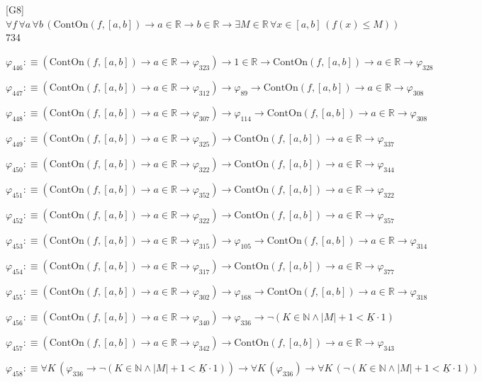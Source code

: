 \begin{fullproof}{[G8]}{$\forall f\,\forall a\,\forall b\,(\mathrm{ContOn}(f,[a,b]) \to a \in \mathbb{R} \to b \in \mathbb{R} \to \exists M \in \mathbb{R}\,\forall x \in [a,b]\,(f(x) \leq M))$}{734}
\begin{abbrevlist}
\item $\varphi_{446} :\equiv (\mathrm{ContOn}(f,[a,b]) \to a \in \mathbb{R} \to \varphi_{323}) \to 1 \in \mathbb{R} \to \mathrm{ContOn}(f,[a,b]) \to a \in \mathbb{R} \to \varphi_{328}$
\item $\varphi_{447} :\equiv (\mathrm{ContOn}(f,[a,b]) \to a \in \mathbb{R} \to \varphi_{312}) \to \varphi_{89} \to \mathrm{ContOn}(f,[a,b]) \to a \in \mathbb{R} \to \varphi_{308}$
\item $\varphi_{448} :\equiv (\mathrm{ContOn}(f,[a,b]) \to a \in \mathbb{R} \to \varphi_{307}) \to \varphi_{114} \to \mathrm{ContOn}(f,[a,b]) \to a \in \mathbb{R} \to \varphi_{308}$
\item $\varphi_{449} :\equiv (\mathrm{ContOn}(f,[a,b]) \to a \in \mathbb{R} \to \varphi_{325}) \to \mathrm{ContOn}(f,[a,b]) \to a \in \mathbb{R} \to \varphi_{337}$
\item $\varphi_{450} :\equiv (\mathrm{ContOn}(f,[a,b]) \to a \in \mathbb{R} \to \varphi_{322}) \to \mathrm{ContOn}(f,[a,b]) \to a \in \mathbb{R} \to \varphi_{344}$
\item $\varphi_{451} :\equiv (\mathrm{ContOn}(f,[a,b]) \to a \in \mathbb{R} \to \varphi_{352}) \to \mathrm{ContOn}(f,[a,b]) \to a \in \mathbb{R} \to \varphi_{322}$
\item $\varphi_{452} :\equiv (\mathrm{ContOn}(f,[a,b]) \to a \in \mathbb{R} \to \varphi_{322}) \to \mathrm{ContOn}(f,[a,b]) \to a \in \mathbb{R} \to \varphi_{357}$
\item $\varphi_{453} :\equiv (\mathrm{ContOn}(f,[a,b]) \to a \in \mathbb{R} \to \varphi_{315}) \to \varphi_{105} \to \mathrm{ContOn}(f,[a,b]) \to a \in \mathbb{R} \to \varphi_{314}$
\item $\varphi_{454} :\equiv (\mathrm{ContOn}(f,[a,b]) \to a \in \mathbb{R} \to \varphi_{317}) \to \mathrm{ContOn}(f,[a,b]) \to a \in \mathbb{R} \to \varphi_{377}$
\item $\varphi_{455} :\equiv (\mathrm{ContOn}(f,[a,b]) \to a \in \mathbb{R} \to \varphi_{302}) \to \varphi_{168} \to \mathrm{ContOn}(f,[a,b]) \to a \in \mathbb{R} \to \varphi_{318}$
\item $\varphi_{456} :\equiv (\mathrm{ContOn}(f,[a,b]) \to a \in \mathbb{R} \to \varphi_{340}) \to \varphi_{336} \to \neg (K \in \mathbb{N} \land \lvert M \rvert + 1 < \underline{K} \cdot 1)$
\item $\varphi_{457} :\equiv (\mathrm{ContOn}(f,[a,b]) \to a \in \mathbb{R} \to \varphi_{342}) \to \mathrm{ContOn}(f,[a,b]) \to a \in \mathbb{R} \to \varphi_{343}$
\item $\varphi_{458} :\equiv \forall K\,(\varphi_{336} \to \neg (K \in \mathbb{N} \land \lvert M \rvert + 1 < \underline{K} \cdot 1)) \to \forall K\,(\varphi_{336}) \to \forall K\,(\neg (K \in \mathbb{N} \land \lvert M \rvert + 1 < \underline{K} \cdot 1))$

\end{abbrevlist}
\end{fullproof}
